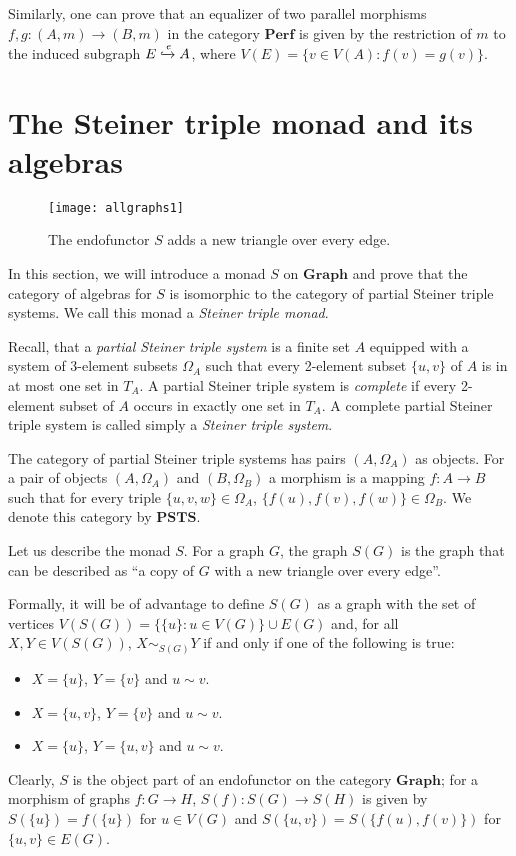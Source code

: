 \documentclass[reqno,A4paper]{amsart}
\newcommand{\PSTS}{\mathbf{PSTS}}
\newcommand{\Graph}{\mathbf{Graph}}
\newcommand{\Perf}{\mathbf{Perf}}
\theoremstyle{definition}
\numberwithin{equation}{section}
\begin{document}
Similarly, one can prove that an equalizer of two parallel morphisms
$f,g:(A,m)\to (B,m)$ in the category $\Perf$ is given by the restriction of $m$ to the induced
subgraph $E\xhookrightarrow{e} A$, where $V(E)=\{v\in V(A):f(v)=g(v)\}$. 

\section{The Steiner triple monad and its algebras}

\begin{figure}
\begin{center}
\texttt{[image: allgraphs1]}
\end{center}
\caption{The endofunctor $S$ adds a new triangle over every edge.}
\label{fig:steiner}
\end{figure}

In this section, we will introduce a monad $S$ on $\Graph$ and prove that
the category of algebras for $S$ is isomorphic to the category of
partial Steiner triple systems. We call this monad a 
{\em Steiner triple monad}.

Recall, that a {\em partial Steiner triple system} is a finite set $A$ equipped with a system of
3-element subsets $\Omega_A$ such that every 2-element subset $\{u,v\}$ of $A$ is in at most
one set in $T_A$. 
A partial Steiner triple system is {\em complete} if every 2-element
subset of $A$ occurs in exactly one set in $T_A$. A complete partial Steiner triple system is called
simply a {\em Steiner triple system}.

The category of partial Steiner triple systems has pairs $(A,\Omega_A)$ as objects. For 
a pair of objects $(A,\Omega_A)$ and $(B,\Omega_B)$ a morphism is a mapping $f:A\to B$ such that for 
every triple $\{u,v,w\}\in \Omega_A$, $\{f(u),f(v),f(w)\}\in\Omega_B$. We denote this
category by $\PSTS$.

Let us describe the monad $S$.  For a graph $G$, the graph $S(G)$ is the graph
that can be described as ``a copy of $G$ with a new triangle over every edge''.

Formally, it will be of advantage to define $S(G)$ as a graph
with the set of vertices $V(S(G))=\{\{u\}:u\in V(G)\}\cup E(G)$ and, for all $X,Y\in V(S(G))$, 
$X\sim_{S(G)}Y$ if and only if one of the following is true:
\begin{itemize}
\item $X=\{u\}$, $Y=\{v\}$ and $u\sim v$.
\item $X=\{u,v\}$, $Y=\{v\}$ and $u\sim v$.
\item $X=\{u\}$, $Y=\{u,v\}$ and $u\sim v$.
\end{itemize}
Clearly, $S$ is the object part of an endofunctor on the category $\Graph$; for
a morphism of graphs $f:G\to H$, $S(f):S(G)\to S(H)$ is given by
$S(\{u\})=f(\{u\})$ for $u\in V(G)$ and $S(\{u,v\})=S(\{f(u),f(v)\})$ for
$\{u,v\}\in E(G)$.
\end{document}
